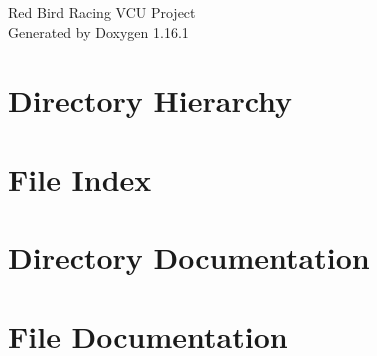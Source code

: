 \documentclass[twoside]{book}
\newcommand{\+}{\discretionary{\mbox{\scriptsize$\hookleftarrow$}}{}{}}
\newcommand{\clearemptydoublepage}{%
    \newpage{\pagestyle{empty}\cleardoublepage}%
  }
\begin{document}
  \raggedbottom
    \hypersetup{pageanchor=false,
                bookmarksnumbered=true,
                pdfencoding=unicode
               }
  \begin{titlepage}
  \vspace*{7cm}
  \begin{center}%
  {\Large Red Bird Racing VCU Project}\\
  \vspace*{1cm}
  {\large Generated by Doxygen 1.16.1}\\
  \end{center}
  \end{titlepage}
  \clearemptydoublepage
  \tableofcontents
  \clearemptydoublepage
  \hypersetup{pageanchor=true}
\chapter{Directory Hierarchy}

\chapter{File Index}

\chapter{Directory Documentation}

\chapter{File Documentation}




  \backmatter
  \newpage
  \clearemptydoublepage
  \printindex
\end{document}

